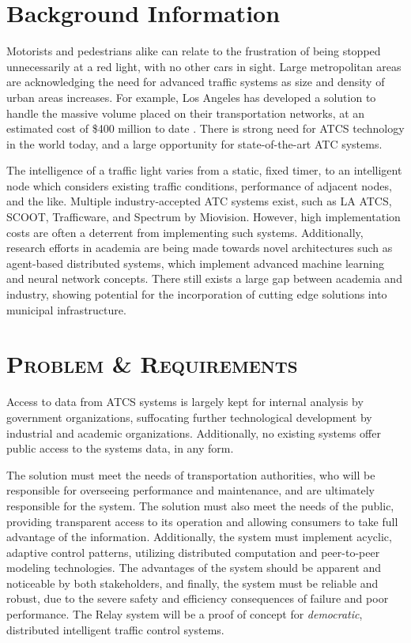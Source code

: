 \documentclass[a4paper,10pt]{article}
\begin{document}
\begin{multicols}{2}
\setlength{\parskip}{6pt}

\section{Background Information}
Motorists and pedestrians alike can relate to the frustration of being stopped unnecessarily at a red light, with no other cars in sight.
Large metropolitan areas are acknowledging the need for advanced traffic systems as size and density of urban areas increases.
For example, Los Angeles has developed a solution to handle the massive volume placed on their transportation networks, at an estimated cost of \$400 million to date \cite{la-atcs-article}.
There is strong need for ATCS technology in the world today, and a large opportunity for state-of-the-art ATC systems.

The intelligence of a traffic light varies from a static, fixed timer, to an intelligent node which considers existing traffic conditions, performance of adjacent nodes, and the like.
Multiple industry-accepted ATC systems exist, such as LA ATCS, SCOOT, Trafficware, and Spectrum by Miovision.
However, high implementation costs are often a deterrent from implementing such systems.
Additionally, research efforts in academia are being made towards novel architectures such as agent-based distributed systems, which implement advanced machine learning and neural network concepts\cite{1688100, 5073360, uot-article}.
There still exists a large gap between academia and industry, showing potential for the incorporation of cutting edge solutions into municipal infrastructure.

\section{\textsc{Problem \& Requirements}}

Access to data from ATCS systems is largely kept for internal analysis by government organizations, suffocating further technological development by industrial and academic organizations.
Additionally, no existing systems offer public access to the systems data, in any form.

The solution must meet the needs of transportation authorities, who will be responsible for overseeing performance and maintenance, and are ultimately responsible for the system.
The solution must also meet the needs of the public, providing transparent access to its operation and allowing consumers to take full advantage of the information.
Additionally, the system must implement acyclic, adaptive control patterns, utilizing distributed computation and peer-to-peer modeling technologies.
The advantages of the system should be apparent and noticeable by both stakeholders, and finally, the system must be reliable and robust, due to the severe safety and efficiency consequences of failure and poor performance. 
The Relay system will be a proof of concept for \emph{democratic}, distributed intelligent traffic control systems.


\end{multicols}
\end{document}
